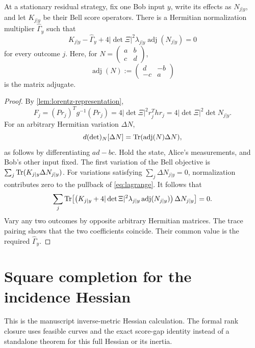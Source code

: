 \begin{lemma}
\label{lem:determinant-pullback}
At a stationary residual strategy, fix one Bob input \(y\), write its effects
as \(N_{j|y}\), and let \(K_{j|y}\) be their Bell score operators. There is a
Hermitian normalization multiplier \(\widehat\Gamma_y\) such that
\begin{equation}
\label{eq:effect-kkt}
K_{j|y}-\widehat\Gamma_y+
4|\det\Xi|^2\lambda_{j|y}\operatorname{adj}(N_{j|y})=0
\end{equation}
for every outcome \(j\). Here, for
\(N=\left(\begin{smallmatrix}a&b\\c&d\end{smallmatrix}\right)\),
\[
\operatorname{adj}(N):=
\begin{pmatrix}d&-b\\-c&a\end{pmatrix}
\]
is the matrix adjugate.
\end{lemma}

\begin{proof}
By \cref{lem:lorentz-representation},
\[
F_j=(Pr_j)^Tg^{-1}(Pr_j)
=4|\det\Xi|^2r_j^Thr_j
=4|\det\Xi|^2\det N_{j|y}.
\]
For an arbitrary Hermitian variation \(\Delta N\),
\[
d(\det)_N[\Delta N]=\operatorname{Tr}(\operatorname{adj}(N)\Delta N),
\]
as follows by differentiating \(ad-bc\). Hold the state, Alice's
measurements, and Bob's other input fixed. The first variation of the Bell
objective is \(\sum_j\operatorname{Tr}(K_{j|y}\Delta N_{j|y})\). For variations
satisfying \(\sum_j\Delta N_{j|y}=0\), normalization contributes zero to
the pullback of \eqref{eq:lagrange}. It follows that
\[
\sum_j\operatorname{Tr}\!\left[
\left(K_{j|y}+4|\det\Xi|^2\lambda_{j|y}\operatorname{adj}(N_{j|y})\right)
\Delta N_{j|y}\right]=0 .
\]
Vary any two outcomes by opposite arbitrary Hermitian matrices. The trace
pairing shows that the two coefficients coincide. Their common value is
the required \(\widehat\Gamma_y\).
\end{proof}

\section{Square completion for the incidence Hessian}
\label{app:square-completion}

This is the manuscript inverse-metric Hessian calculation. The formal
rank closure uses feasible curves and the exact score-gap identity instead
of a standalone theorem for this full Hessian or its inertia.

